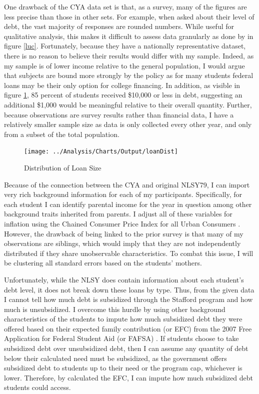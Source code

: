 \documentclass[12pt]{article}
\begin{document}
	One drawback of the CYA data set is that, as a survey, many of the figures are less precise than those in other sets. For example, when asked about their level of debt, the vast majority of responses are rounded numbers. While useful for qualitative analysis, this makes it difficult to assess data granularly as done by \textcite{lucca2018} in figure \ref{luc}. Fortunately, because they have a nationally representative dataset, there is no reason to believe their results would differ with my sample. Indeed, as my sample is of lower income relative to the general population, I would argue that subjects are bound more strongly by the policy as for many students federal loans may be their only option for college financing. In addition, as visible in figure \ref{loanDist}, 85 percent of students received \$10,000 or less in debt, suggesting an additional \$1,000 would be meaningful relative to their overall quantity. Further, because observations are survey results rather than financial data, I have a relatively smaller sample size as data is only collected every other year, and only from a subset of the total population.
	

	\begin{figure}
		\centering
		\caption{Distribution of Loan Size}
		\label{loanDist}
		\texttt{[image: ../Analysis/Charts/Output/loanDist]}
	\end{figure}

	
	Because of the connection between the CYA and original NLSY79, I can import very rich background information for each of my participants. Specifically, for each student I can identify parental income for the year in question among other background traits inherited from parents. I adjust all of these variables for inflation using the Chained Consumer Price Index for all Urban Consumers \parencite{bls2019}. However, the drawback of being linked to the prior survey is that many of my observations are siblings, which would imply that they are not independently distributed if they share unobservable characteristics. To combat this issue, I will be clustering all standard errors based on the students' mothers. 
	
	Unfortunately, while the NLSY does contain information about each student's debt level, it does not break down these loans by type. Thus, from the given data I cannot tell how much debt is subsidized through the Stafford program and how much is unsubsidized. I overcome this hurdle by using other background characteristics of the students to impute how much subsidized debt they were offered based on their expected family contribution (or EFC) from the 2007 Free Application for Federal Student Aid (or FAFSA) \parencite{doe2007}. If students choose to take subsidized debt over unsubsidized debt, then I can assume any quantity of debt below their calculated need must be subsidized, as the government offers subsidized debt to students up to their need or the program cap, whichever is lower. Therefore, by calculated the EFC, I can impute how much subsidized debt students could access.
	
\end{document}
